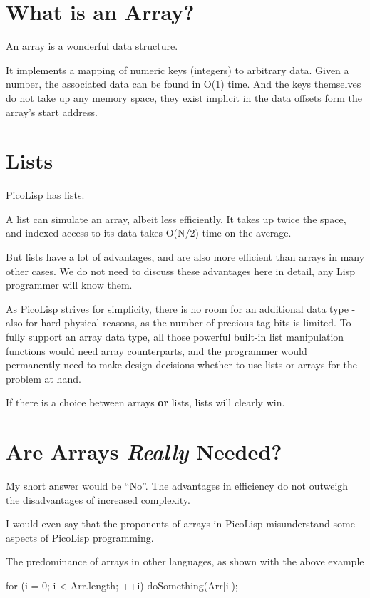 \section{What is an Array?}
\label{sec:array-abst-what-is-an-array?}

An array is a wonderful data structure.

It implements a mapping of numeric keys (integers) to arbitrary data. Given a
number, the associated data can be found in O(1) time. And the keys themselves
do not take up any memory space, they exist implicit in the data offsets form
the array's start address.

\section{Lists}
\label{sec:array-abst-lists}

PicoLisp has lists.

A list can simulate an array, albeit less efficiently. It takes up twice the
space, and indexed access to its data takes O(N/2) time on the average.

But lists have a lot of advantages, and are also more efficient than arrays in
many other cases. We do not need to discuss these advantages here in detail, any
Lisp programmer will know them.

As PicoLisp strives for simplicity, there is no room for an additional data type
- also for hard physical reasons, as the number of precious tag bits is limited.
To fully support an array data type, all those powerful built-in list
manipulation functions would need array counterparts, and the programmer would
permanently need to make design decisions whether to use lists or arrays for the
problem at hand.

If there is a choice between arrays \textbf{or} lists, lists will clearly win.

\section{Are Arrays \textit{Really} Needed?}
\label{sec:array-abst-are-arrays-really-needed}

My short answer would be ``No''. The advantages in efficiency do not outweigh the
disadvantages of increased complexity.

I would even say that the proponents of arrays in PicoLisp misunderstand some
aspects of PicoLisp programming.

The predominance of arrays in other languages, as shown with the above example
\begin{wideverbatim}
   for (i = 0; i < Arr.length; ++i)
      doSomething(Arr[i]);
\end{wideverbatim}

